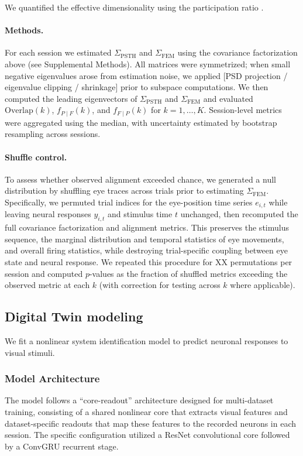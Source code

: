 \documentclass{lite}
\begin{document}
We quantified the effective dimensionality using the participation ratio \cite{pospisil2025revisiting}.

\paragraph{Methods.}
For each session we estimated $\Sigma_{\mathrm{PSTH}}$ and $\Sigma_{\mathrm{FEM}}$ using the
covariance factorization above (see Supplemental Methods). All matrices were symmetrized; when
small negative eigenvalues arose from estimation noise, we applied [PSD projection / eigenvalue
clipping / shrinkage] prior to subspace computations. We then computed the leading eigenvectors
of $\Sigma_{\mathrm{PSTH}}$ and $\Sigma_{\mathrm{FEM}}$ and evaluated $\mathrm{Overlap}(k)$,
$f_{P\mid F}(k)$, and $f_{F\mid P}(k)$ for $k=1,\dots,K$. Session-level metrics were aggregated
using the median, with uncertainty estimated by bootstrap resampling across sessions.

\paragraph{Shuffle control.}
To assess whether observed alignment exceeded chance, we generated a null distribution by
shuffling eye traces across trials prior to estimating $\Sigma_{\mathrm{FEM}}$. Specifically, we
permuted trial indices for the eye-position time series $e_{i,t}$ while leaving neural responses
$y_{i,t}$ and stimulus time $t$ unchanged, then recomputed the full covariance factorization and
alignment metrics. This preserves the stimulus sequence, the marginal distribution and temporal
statistics of eye movements, and overall firing statistics, while destroying trial-specific coupling
between eye state and neural response. We repeated this procedure for XX permutations per session
and computed $p$-values as the fraction of shuffled metrics exceeding the observed metric at each
$k$ (with correction for testing across $k$ where applicable).


\subsection{Digital Twin modeling}
We fit a nonlinear system identification model to predict neuronal responses to visual stimuli. 

\subsubsection{Model Architecture}
The model follows a ``core-readout'' architecture \cite{wang2025foundation} designed for multi-dataset training, consisting of a shared nonlinear core that extracts visual features and dataset-specific readouts that map these features to the recorded neurons in each session. The specific configuration utilized a ResNet \cite{he2016deep,he2016identity} convolutional core followed by a ConvGRU \cite{ballas2015delving} recurrent stage.
\end{document}

